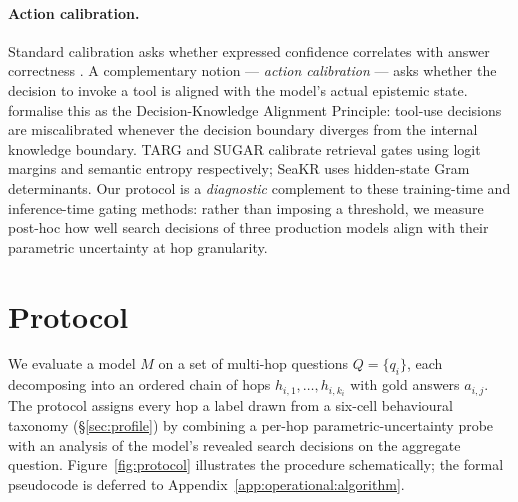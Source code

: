\documentclass[10pt,letterpaper]{article}
\begin{document}
\paragraph{Action calibration.}
Standard calibration asks whether expressed confidence correlates with answer
correctness \citep{farquhar2024}. A complementary notion --- \emph{action calibration}
--- asks whether the decision to invoke a tool is aligned with the model's actual
epistemic state. \citet{towardtheory2025} formalise this as the Decision-Knowledge
Alignment Principle: tool-use decisions are miscalibrated whenever the decision
boundary diverges from the internal knowledge boundary. TARG \citep{targ2026}
and SUGAR \citep{sugar2025} calibrate retrieval gates using logit margins and
semantic entropy respectively; SeaKR \citep{seakr2025} uses hidden-state Gram
determinants. Our protocol is a \emph{diagnostic} complement to these
training-time and inference-time gating methods: rather than imposing a threshold,
we measure post-hoc how well search decisions of three production models align with
their parametric uncertainty at hop granularity.

\section{Protocol}\label{sec:protocol}

We evaluate a model $M$ on a set of multi-hop questions $Q=\{q_i\}$, each decomposing
into an ordered chain of hops $h_{i,1},\dots,h_{i,k_i}$ with gold answers $a_{i,j}$.
The protocol assigns every hop a label drawn from a six-cell behavioural taxonomy
(\S\ref{sec:profile}) by combining a per-hop parametric-uncertainty probe with an
analysis of the model's revealed search decisions on the aggregate question.
Figure~\ref{fig:protocol} illustrates the procedure schematically; the formal
pseudocode is deferred to Appendix~\ref{app:operational:algorithm}.
\end{document}
